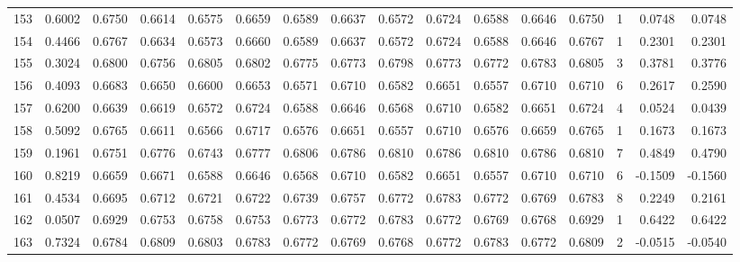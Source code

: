\begin{tabular}{lrrrrrrrrrrrrrrr}
153 &      0.6002 &  0.6750 &  0.6614 &  0.6575 &  0.6659 &  0.6589 &  0.6637 &  0.6572 &  0.6724 &  0.6588 &   0.6646 &     0.6750 &      1 &                    0.0748 &                     0.0748 \\
154 &      0.4466 &  0.6767 &  0.6634 &  0.6573 &  0.6660 &  0.6589 &  0.6637 &  0.6572 &  0.6724 &  0.6588 &   0.6646 &     0.6767 &      1 &                    0.2301 &                     0.2301 \\
155 &      0.3024 &  0.6800 &  0.6756 &  0.6805 &  0.6802 &  0.6775 &  0.6773 &  0.6798 &  0.6773 &  0.6772 &   0.6783 &     0.6805 &      3 &                    0.3781 &                     0.3776 \\
156 &      0.4093 &  0.6683 &  0.6650 &  0.6600 &  0.6653 &  0.6571 &  0.6710 &  0.6582 &  0.6651 &  0.6557 &   0.6710 &     0.6710 &      6 &                    0.2617 &                     0.2590 \\
157 &      0.6200 &  0.6639 &  0.6619 &  0.6572 &  0.6724 &  0.6588 &  0.6646 &  0.6568 &  0.6710 &  0.6582 &   0.6651 &     0.6724 &      4 &                    0.0524 &                     0.0439 \\
158 &      0.5092 &  0.6765 &  0.6611 &  0.6566 &  0.6717 &  0.6576 &  0.6651 &  0.6557 &  0.6710 &  0.6576 &   0.6659 &     0.6765 &      1 &                    0.1673 &                     0.1673 \\
159 &      0.1961 &  0.6751 &  0.6776 &  0.6743 &  0.6777 &  0.6806 &  0.6786 &  0.6810 &  0.6786 &  0.6810 &   0.6786 &     0.6810 &      7 &                    0.4849 &                     0.4790 \\
160 &      0.8219 &  0.6659 &  0.6671 &  0.6588 &  0.6646 &  0.6568 &  0.6710 &  0.6582 &  0.6651 &  0.6557 &   0.6710 &     0.6710 &      6 &                   -0.1509 &                    -0.1560 \\
161 &      0.4534 &  0.6695 &  0.6712 &  0.6721 &  0.6722 &  0.6739 &  0.6757 &  0.6772 &  0.6783 &  0.6772 &   0.6769 &     0.6783 &      8 &                    0.2249 &                     0.2161 \\
162 &      0.0507 &  0.6929 &  0.6753 &  0.6758 &  0.6753 &  0.6773 &  0.6772 &  0.6783 &  0.6772 &  0.6769 &   0.6768 &     0.6929 &      1 &                    0.6422 &                     0.6422 \\
163 &      0.7324 &  0.6784 &  0.6809 &  0.6803 &  0.6783 &  0.6772 &  0.6769 &  0.6768 &  0.6772 &  0.6783 &   0.6772 &     0.6809 &      2 &                   -0.0515 &                    -0.0540 \\

\end{tabular}
